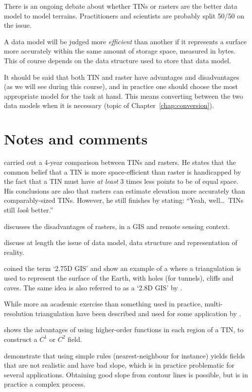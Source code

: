 There is an ongoing debate about whether TINs or rasters are the better data model to model terrains.
Practitioners and scientists are probably split 50/50 on the issue.

A data model will be judged more \emph{efficient} than another if it represents a surface more accurately within the same amount of storage space, measured in bytes.
This of course depends on the data structure used to store that data model.

It should be said that both TIN and raster have advantages and disadvantages (as we will see during this course), and in practice one should choose the most appropriate model for the task at hand.
This means converting between the two data models when it is necessary (topic of Chapter~\ref{chap:conversion}).


%
\section{Notes and comments}

\citet{Kumler94} carried out a 4-year comparison between TINs and rasters.
He states that the common belief that a TIN is more space-efficient than raster is handicapped by the fact that a TIN must have \emph{at least} 3 times less points to be of equal space.
His conclusions are also that rasters can estimate elevation more accurately than comparably-sized TINs.
However, he still finishes by stating: ``Yeah, well\ldots\ TINs still \emph{look} better.'' 

\citet{Fisher97} discusses the disadvantages of rasters, in a GIS and remote sensing context.

\citet{Frank92,Goodchild92a} discuss at length the issue of data model, data structure and representation of reality. 

\citet{Tse04} coined the term `2.75D GIS' and show an example of a where a triangulation is used to represent the surface of the Earth, with holes (for tunnels), cliffs and caves. 
The same idea is also referred to as a `2.8D GIS' by \citet{Groger05}.

While more an academic exercise than something used in practice, multi-resolution triangulation have been described and used for some application by \citet{DeFloriani02}.

\citet{Akima78} shows the advantages of using higher-order functions in each region of a TIN, to construct a $C^1$ or $C^2$ field. 

\citet{Dakowicz03} demonstrate that using simple rules (nearest-neighbour for instance) yields fields that are not realistic and have bad slope, which is in practice problematic for several applications.
Obtaining good slope from contour lines is possible, but is in practice a complex process.


